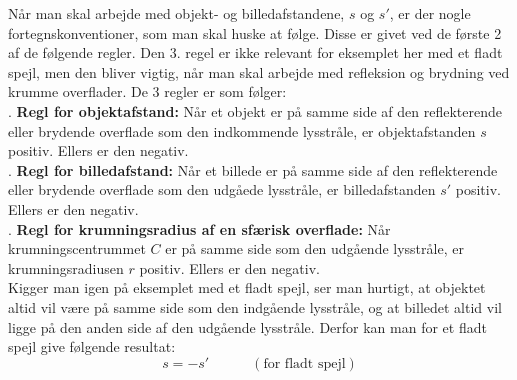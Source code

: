 Når man skal arbejde med objekt- og billedafstandene, $s$ og $s'$, er der nogle fortegnskonventioner, som man skal huske at følge. Disse er givet ved de første 2 af de følgende regler. Den 3. regel er ikke relevant for eksemplet her med et fladt spejl, men den bliver vigtig, når man skal arbejde med refleksion og brydning ved krumme overflader. De 3 regler er som følger:\\

. \textbf{Regl for objektafstand:} Når et objekt er på samme side af den reflekterende eller brydende overflade som den indkommende lysstråle, er objektafstanden $s$ positiv. Ellers er den negativ.\\

. \textbf{Regl for billedafstand:} Når et billede er på samme side af den reflekterende eller brydende overflade som den udgåede lysstråle, er billedafstanden $s'$ positiv. Ellers er den negativ.\\

. \textbf{Regl for krumningsradius af en sfærisk overflade:} Når krumningscentrummet $C$ er på samme side som den udgående lysstråle, er krumningsradiusen $r$ positiv. Ellers er den negativ.\\

Kigger man igen på eksemplet med et fladt spejl, ser man hurtigt, at objektet altid vil være på samme side som den indgående lysstråle, og at billedet altid vil ligge på den anden side af den udgående lysstråle. Derfor kan man for et fladt spejl give følgende resultat:
\begin{equation}
s = -s' \quad \quad \quad \left( \text{for fladt spejl} \right)
\label{obj_img_fladt}
\end{equation}

